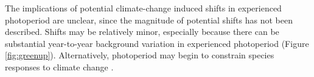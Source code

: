 \documentclass{article}
\begin{document}
\par The implications of potential climate-change induced shifts in experienced photoperiod are unclear, since the magnitude of potential shifts has not been described. Shifts may be relatively minor, especially because there can be substantial year-to-year background variation in experienced photoperiod (Figure \ref{fig:greenup}). Alternatively, photoperiod may begin to constrain species responses to climate change \citep{koerner2010b}.

\end{document}

